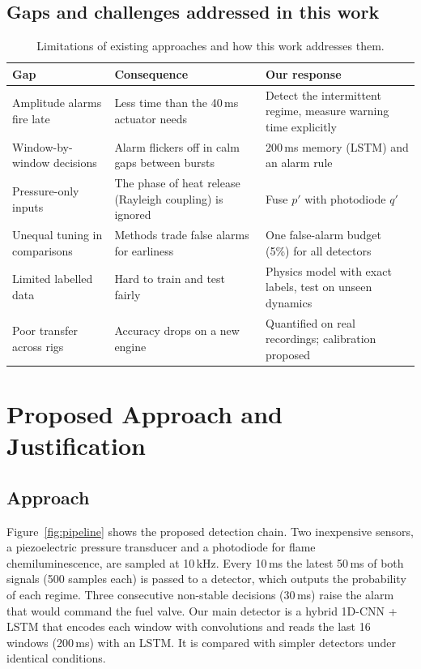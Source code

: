 \documentclass[11pt,a4paper]{article}
\newcommand{\pp}{p'}
\newcommand{\qq}{q'}
\begin{document}
\subsection{Gaps and challenges addressed in this work}
\begin{table}[H]\centering\small
\caption{Limitations of existing approaches and how this work addresses them.}\label{tab:gaps}
\begin{tabular}{L{4.1cm}L{5cm}L{5.3cm}}\toprule
Gap & Consequence & Our response\\\midrule
Amplitude alarms fire late & Less time than the 40\,ms actuator needs & Detect the intermittent regime, measure warning time explicitly\\
Window-by-window decisions & Alarm flickers off in calm gaps between bursts & 200\,ms memory (LSTM) and an alarm rule\\
Pressure-only inputs & The phase of heat release (Rayleigh coupling) is ignored & Fuse $\pp$ with photodiode $\qq$\\
Unequal tuning in comparisons & Methods trade false alarms for earliness & One false-alarm budget (5\%) for all detectors\\
Limited labelled data & Hard to train and test fairly & Physics model with exact labels, test on unseen dynamics\\
Poor transfer across rigs & Accuracy drops on a new engine & Quantified on real recordings; calibration proposed\\
\bottomrule\end{tabular}
\end{table}

\section{Proposed Approach and Justification}\label{sec:approach}

\subsection{Approach}
Figure~\ref{fig:pipeline} shows the proposed detection chain. Two inexpensive sensors, a piezoelectric pressure transducer and a photodiode for flame chemiluminescence, are sampled at 10\,kHz. Every 10\,ms the latest 50\,ms of both signals (500 samples each) is passed to a detector, which outputs the probability of each regime. Three consecutive non-stable decisions (30\,ms) raise the alarm that would command the fuel valve. Our main detector is a hybrid 1D-CNN + LSTM that encodes each window with convolutions and reads the last 16 windows (200\,ms) with an LSTM. It is compared with simpler detectors under identical conditions.
\end{document}
